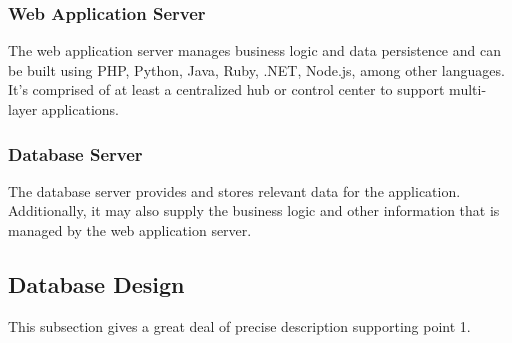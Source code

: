 \subsubsection{Web Application Server}
The web application server manages business logic and data persistence and can be built using PHP, Python, Java, Ruby, .NET, Node.js, among other languages. It’s comprised of at least a centralized hub or control center to support multi-layer applications.

\subsubsection{Database Server}
The database server provides and stores relevant data for the application. Additionally, it may also supply the business logic and other information that is managed by the web application server.

\subsection{Database Design}
This subsection gives a great deal of precise description supporting point 1.

